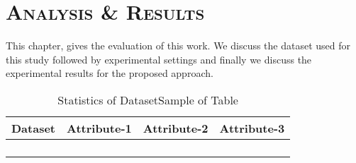 \chapter{\textsc{Analysis \& Results}}

This chapter, gives the evaluation of this work. We  discuss the dataset used for this study followed by experimental settings and finally we discuss the experimental results for the proposed approach.


\renewcommand{\arraystretch}{1.0}
\begin{table}[h]
\centering
\caption{Statistics of DatasetSample of Table}
\label{table:1}

\begin{tabular}{|l|l|l|l|}
\hline
\textbf{Dataset} & \textbf{Attribute-1}     & \textbf{Attribute-2}     &  \textbf{Attribute-3} \\\hline
 &     &    &  \\\hline
 &     &    &   \\\hline
 &     &    &  \\\hline
 &     &    &    \\\hline

\end{tabular}
\end{table}%